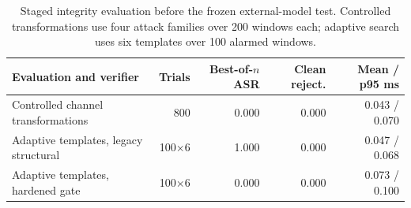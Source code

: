 \begin{table}[!htbp]
\centering
\caption{Staged integrity evaluation before the frozen external-model test. Controlled transformations use four attack families over 200 windows each; adaptive search uses six templates over 100 alarmed windows.}
\label{tab:integrity-stages}
\small
\begin{tabularx}{\linewidth}{@{}Xrrrr@{}}
\toprule
Evaluation and verifier & Trials & Best-of-$n$ ASR & Clean reject. & Mean / p95 ms \\
\midrule
Controlled channel transformations & 800 & 0.000 & 0.000 & 0.043 / 0.070 \\
Adaptive templates, legacy structural & 100$\times$6 & 1.000 & 0.000 & 0.047 / 0.068 \\
Adaptive templates, hardened gate & 100$\times$6 & 0.000 & 0.000 & 0.073 / 0.100 \\
\bottomrule
\end{tabularx}
\end{table}
